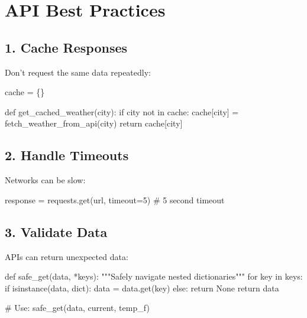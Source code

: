 \documentclass[
  letterpaper,
  DIV=11,
  numbers=noendperiod,
  oneside]{scrreprt}
\newenvironment{Shaded}{}{}
\newcommand{\BuiltInTok}[1]{\textcolor[rgb]{0.84,0.23,0.29}{#1}}
\newcommand{\CommentTok}[1]{\textcolor[rgb]{0.42,0.45,0.49}{#1}}
\newcommand{\ControlFlowTok}[1]{\textcolor[rgb]{0.84,0.23,0.29}{#1}}
\newcommand{\DecValTok}[1]{\textcolor[rgb]{0.00,0.36,0.77}{#1}}
\newcommand{\KeywordTok}[1]{\textcolor[rgb]{0.84,0.23,0.29}{#1}}
\newcommand{\NormalTok}[1]{\textcolor[rgb]{0.14,0.16,0.18}{#1}}
\newcommand{\OperatorTok}[1]{\textcolor[rgb]{0.14,0.16,0.18}{#1}}
\newcommand{\VariableTok}[1]{\textcolor[rgb]{0.89,0.38,0.04}{#1}}
\begin{document}
\section{API Best Practices}\label{api-best-practices}

\subsection{1. Cache Responses}\label{cache-responses}

Don't request the same data repeatedly:

\begin{Shaded}
\begin{Highlighting}[]
\NormalTok{cache }\OperatorTok{=}\NormalTok{ \{\}}

\KeywordTok{def}\NormalTok{ get\_cached\_weather(city):}
    \ControlFlowTok{if}\NormalTok{ city }\KeywordTok{not} \KeywordTok{in}\NormalTok{ cache:}
\NormalTok{        cache[city] }\OperatorTok{=}\NormalTok{ fetch\_weather\_from\_api(city)}
    \ControlFlowTok{return}\NormalTok{ cache[city]}
\end{Highlighting}
\end{Shaded}

\subsection{2. Handle Timeouts}\label{handle-timeouts}

Networks can be slow:

\begin{Shaded}
\begin{Highlighting}[]
\NormalTok{response }\OperatorTok{=}\NormalTok{ requests.get(url, timeout}\OperatorTok{=}\DecValTok{5}\NormalTok{)  }\CommentTok{\# 5 second timeout}
\end{Highlighting}
\end{Shaded}

\subsection{3. Validate Data}\label{validate-data}

APIs can return unexpected data:

\begin{Shaded}
\begin{Highlighting}[]
\KeywordTok{def}\NormalTok{ safe\_get(data, }\OperatorTok{*}\NormalTok{keys):}
    \CommentTok{"""Safely navigate nested dictionaries"""}
    \ControlFlowTok{for}\NormalTok{ key }\KeywordTok{in}\NormalTok{ keys:}
        \ControlFlowTok{if} \BuiltInTok{isinstance}\NormalTok{(data, }\BuiltInTok{dict}\NormalTok{):}
\NormalTok{            data }\OperatorTok{=}\NormalTok{ data.get(key)}
        \ControlFlowTok{else}\NormalTok{:}
            \ControlFlowTok{return} \VariableTok{None}
    \ControlFlowTok{return}\NormalTok{ data}

\CommentTok{\# Use: safe\_get(data, \textquotesingle{}current\textquotesingle{}, \textquotesingle{}temp\_f\textquotesingle{})}
\end{Highlighting}
\end{Shaded}
\end{document}
